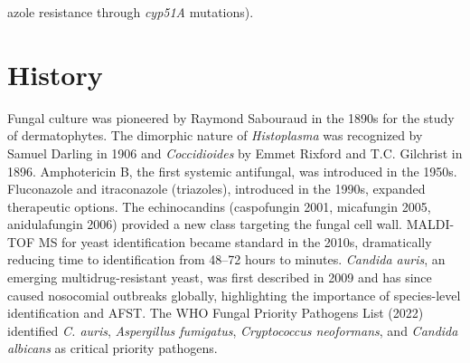 azole resistance through \textit{cyp51A} mutations).

\section*{History}
Fungal culture was pioneered by Raymond Sabouraud in the 1890s for the study of dermatophytes. The dimorphic nature of \textit{Histoplasma} was recognized by Samuel Darling in 1906 and \textit{Coccidioides} by Emmet Rixford and T.C. Gilchrist in 1896. Amphotericin B, the first systemic antifungal, was introduced in the 1950s. Fluconazole and itraconazole (triazoles), introduced in the 1990s, expanded therapeutic options. The echinocandins (caspofungin 2001, micafungin 2005, anidulafungin 2006) provided a new class targeting the fungal cell wall. MALDI-TOF MS for yeast identification became standard in the 2010s, dramatically reducing time to identification from 48--72 hours to minutes. \textit{Candida auris}, an emerging multidrug-resistant yeast, was first described in 2009 and has since caused nosocomial outbreaks globally, highlighting the importance of species-level identification and AFST. The WHO Fungal Priority Pathogens List (2022) identified \textit{C. auris}, \textit{Aspergillus fumigatus}, \textit{Cryptococcus neoformans}, and \textit{Candida albicans} as critical priority pathogens.

